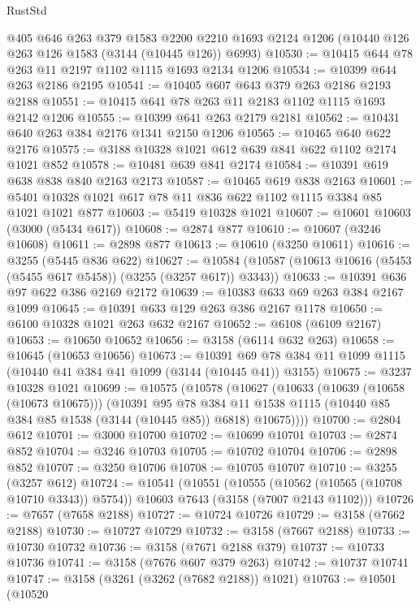 \begin{lexlean}{RustStd}
\begin{coremodule}
    @405
    @646
    @263
    @379
    @1583
    @2200
    @2210
    @1693
    @2124
    @1206
    (@10440 @126 @263 @126 @1583 (@3144 (@10445 @126)) @6993)
@10530 := @10415 @644 @78 @263 @11 @2197 @1102 @1115 @1693 @2134 @1206
@10534 := @10399 @644 @263 @2186 @2195
@10541 := @10405 @607 @643 @379 @263 @2186 @2193 @2188
@10551 := @10415 @641 @78 @263 @11 @2183 @1102 @1115 @1693 @2142 @1206
@10555 := @10399 @641 @263 @2179 @2181
@10562 := @10431 @640 @263 @384 @2176 @1341 @2150 @1206
@10565 := @10465 @640 @622 @2176
@10575 := @3188 @10328 @1021 @612 @639 @841 @622 @1102 @2174 @1021 @852
@10578 := @10481 @639 @841 @2174
@10584 := @10391 @619 @638 @838 @840 @2163 @2173
@10587 := @10465 @619 @838 @2163
@10601 := @5401 @10328 @1021 @617 @78 @11 @836 @622 @1102 @1115 @3384 @85 @1021 @1021 @877
@10603 := @5419 @10328 @1021
@10607 := @10601 @10603 (@3000 (@5434 @617))
@10608 := @2874 @877
@10610 := @10607 (@3246 @10608)
@10611 := @2898 @877
@10613 := @10610 (@3250 @10611)
@10616 := @3255 (@5445 @836 @622)
@10627 := @10584 (@10587 (@10613 @10616 (@5453 (@5455 @617 @5458)) (@3255 (@3257 @617)) @3343))
@10633 := @10391 @636 @97 @622 @386 @2169 @2172
@10639 := @10383 @633 @69 @263 @384 @2167 @1099
@10645 := @10391 @633 @129 @263 @386 @2167 @1178
@10650 := @6100 @10328 @1021 @263 @632 @2167
@10652 := @6108 (@6109 @2167)
@10653 := @10650 @10652
@10656 := @3158 (@6114 @632 @263)
@10658 := @10645 (@10653 @10656)
@10673 := @10391 @69 @78 @384 @11 @1099 @1115 (@10440 @41 @384 @41 @1099 (@3144 (@10445 @41)) @3155)
@10675 := @3237 @10328 @1021
@10699 := @10575
    (@10578
      (@10627
        (@10633
          (@10639 (@10658 (@10673 @10675)))
          (@10391
            @95
            @78
            @384
            @11
            @1538
            @1115
            (@10440 @85 @384 @85 @1538 (@3144 (@10445 @85)) @6818)
            @10675))))
@10700 := @2804 @612
@10701 := @3000 @10700
@10702 := @10699 @10701
@10703 := @2874 @852
@10704 := @3246 @10703
@10705 := @10702 @10704
@10706 := @2898 @852
@10707 := @3250 @10706
@10708 := @10705 @10707
@10710 := @3255 (@3257 @612)
@10724 := @10541
    (@10551
      (@10555 (@10562 (@10565 (@10708 @10710 @3343)) @5754))
      @10603
      @7643
      (@3158 (@7007 @2143 @1102)))
@10726 := @7657 (@7658 @2188)
@10727 := @10724 @10726
@10729 := @3158 (@7662 @2188)
@10730 := @10727 @10729
@10732 := @3158 (@7667 @2188)
@10733 := @10730 @10732
@10736 := @3158 (@7671 @2188 @379)
@10737 := @10733 @10736
@10741 := @3158 (@7676 @607 @379 @263)
@10742 := @10737 @10741
@10747 := @3158 (@3261 (@3262 (@7682 @2188)) @1021)
@10763 := @10501
    (@10520

\end{coremodule}
\end{lexlean}
